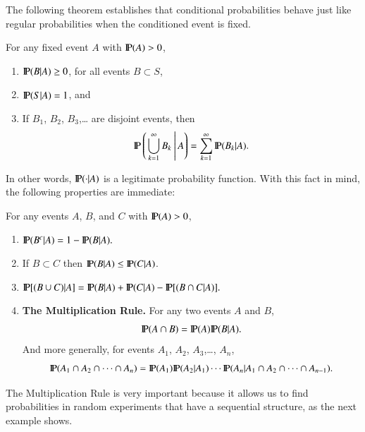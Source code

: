 \documentclass[captions=tableheading]{scrbook}
\begin{document}
The following theorem establishes that conditional probabilities behave just like regular probabilities when the conditioned event is fixed. 

\begin{thm}
For any fixed event \(A\) with \(\P(A)>0\),
\begin{enumerate}
\item \( \P (B|A)\geq 0 \), for all events \( B \subset S\),
\item \( \P (S|A) = 1 \), and
\item If \(B_{1}\), \(B_{2}\), \(B_{3}\),\ldots{} are disjoint events, then
  \begin{equation}
  \P\left(\left.\bigcup_{k=1}^{\infty}B_{k}\:\right|A\right)=\sum_{k=1}^{\infty}\P(B_{k}|A).
  \end{equation}
\end{enumerate}

\end{thm}
In other words, \(\P(\cdot|A)\) is a legitimate probability function. With this fact in mind, the following properties are immediate:

\begin{prop}
For any events \(A\), \(B\), and \(C\) with \(\P(A)>0\),
\begin{enumerate}
\item \( \P ( B^{c} | A ) = 1 - \P (B|A).\)
\item If \(B\subset C\) then \(\P(B|A)\leq\P(C|A)\).
\item \( \P [ ( B\cup C ) | A ] = \P (B|A) + \P(C|A) - \P [ (B \cap C|A) ].\)
\item \textbf{The Multiplication Rule.} For any two events \(A\) and \(B\),
  \begin{equation}
  \P(A\cap B)=\P(A)\P(B|A).\label{eq:multiplication-rule-short}
  \end{equation}
  And more generally, for events \(A_{1}\), \(A_{2}\), \(A_{3}\),\ldots{}, \(A_{n}\),
  \begin{equation}
  \P(A_{1}\cap A_{2}\cap\cdots\cap A_{n})=\P(A_{1})\P(A_{2}|A_{1})\cdots\P(A_{n}|A_{1}\cap A_{2}\cap\cdots\cap A_{n-1}).\label{eq:multiplication-rule-long}
  \end{equation}
\end{enumerate}

\end{prop}
The Multiplication Rule is very important because it allows us to find probabilities in random experiments that have a sequential structure, as the next example shows. 
\end{document}
